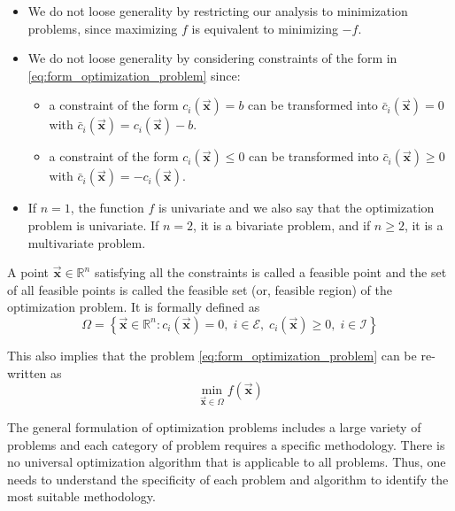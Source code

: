 \documentclass[9pt, headings=standardclasses, parskip=half]{scrartcl}
\renewcommand{\emph}[1]{\textcolor{mypurple}{#1}}
\newcommand{\vect}[1]{\vec{\boldsymbol{#1}}}
\begin{document}
\begin{remark}\leavevmode
  \begin{itemize}
    \item We do not loose generality by restricting our analysis to minimization problems, since maximizing \(f\) is \emph{equivalent to} minimizing \(-f\).
    \item We do not loose generality by considering constraints of the form in \eqref{eq:form_optimization_problem} since:
    \begin{itemize}
      \item a constraint of the form \(c_{i}(\vect{x})=b\) can be transformed into \(\bar{c}_{i}(\vect{x})=0\) with \(\bar{c}_{i}(\vect{x})=c_{i}(\vect{x})-b\).
      \item a constraint of the form \(c_{i}(\vect{x}) \leq 0\) can be transformed into \(\bar{c}_{i}(\vect{x}) \geq 0\) with \(\bar{c}_{i}(\vect{x})=-c_{i}(\vect{x})\).
    \end{itemize}
    \item If \(n=1\), the function \(f\) is \emph{univariate} and we also say that the optimization problem is univariate. If \(n=2\), it is a \emph{bivariate} problem, and if \(n \geq 2\), it is a \emph{multivariate} problem. \qedhere
  \end{itemize}
\end{remark}

A point \(\vect{x}\in\mathbb{R}^{n}\) satisfying all the constraints is called a \emph{feasible point} and the set of all feasible points is called the \emph{feasible set} (or, feasible region) of the optimization problem. It is formally defined as
\begin{equation}
  \label{eq:feasible_set}
\Omega = \left\{ \vect{x}\in\mathbb{R}^{n} : c_{i}(\vect{x})=0,\; i\in\mathcal{E},\; c_{i}(\vect{x})\geq 0,\; i\in\mathcal{I} \right\}
\end{equation}

This also implies that the problem \eqref{eq:form_optimization_problem} can be re-written as
\[
\min_{\vect{x}\in\Omega} f(\vect{x})
\]

The general formulation of optimization problems includes a large variety of problems and each category of problem requires a specific methodology. There is no universal optimization algorithm that is applicable to all problems. Thus, one needs to understand the specificity of each problem and algorithm to identify the most suitable methodology.
\end{document}
